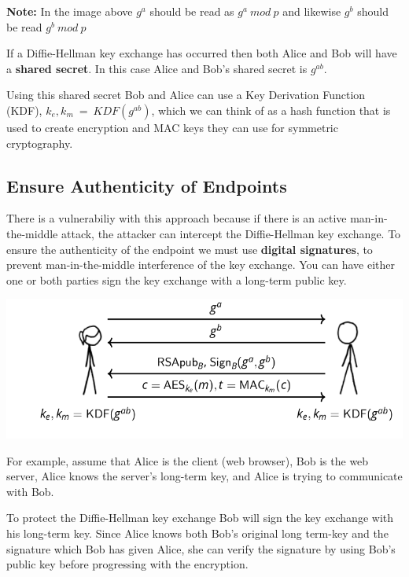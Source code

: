 \documentclass[11pt]{article} %
\begin{document}
{\parindent0pt \textbf{Note:} In the image above $g^{a}$  should be read as 
$g^{a}\ mod\ p$ and likewise $g^{b}$ should be read $g^{b}\ mod\ p$}

\bigskip
{\parindent0pt If a Diffie-Hellman key exchange has occurred then both Alice 
and Bob will have a \textbf{shared secret}. In this case Alice and Bob's shared
secret is $g^{ab}$.}

\bigskip
{\parindent0pt Using this shared secret Bob and Alice can use a Key Derivation
Function (KDF), 
\smallskip
$k_e, k_m\ =\ KDF(g^{ab})$, which we can think of as a hash function that is 
used to create encryption and MAC keys they can use for symmetric cryptography.}

\newpage
\subsection{Ensure Authenticity of Endpoints}
There is a vulnerabiliy with this approach because if there is an active
man-in-the-middle attack, the attacker can intercept the Diffie-Hellman
key exchange.  To ensure the authenticity of the endpoint we must use
\textbf{digital signatures}, to prevent man-in-the-middle interference of the
key exchange.
You can have either one or both parties sign the key exchange with a long-term
public key.

\begin{center}
	\includegraphics[scale=.7]{./tls3.png}
\end{center}

For example, assume that Alice is the client (web browser), Bob is 
the web server, Alice knows the server's long-term key, and Alice is trying to
communicate with Bob.

\bigskip
To protect the Diffie-Hellman key exchange Bob will sign the key exchange with 
his long-term key.  Since Alice knows both Bob's original long term-key and the
signature which Bob has given Alice, she can verify the signature by using Bob's
public key before progressing with the encryption.
\end{document}
